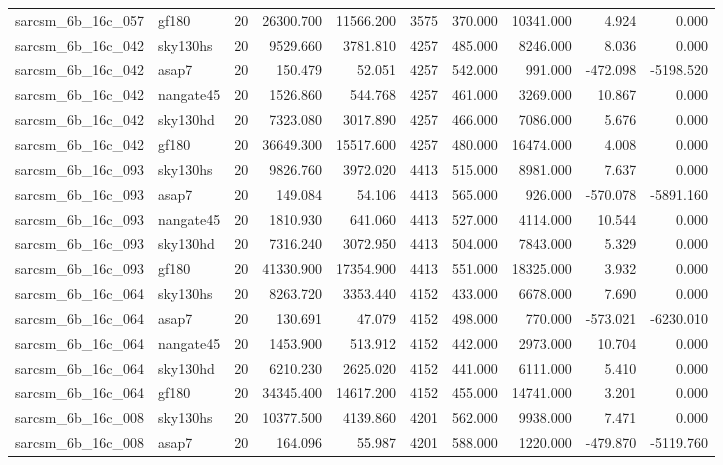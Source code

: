 \documentclass{article}
\begin{document}
\begin{longtable}{llrrrrrrrr}
sarcsm\_6b\_16c\_057 & gf180 & 20 & 26300.700 & 11566.200 & 3575 & 370.000 & 10341.000 & 4.924 & 0.000 \\
sarcsm\_6b\_16c\_042 & sky130hs & 20 & 9529.660 & 3781.810 & 4257 & 485.000 & 8246.000 & 8.036 & 0.000 \\
sarcsm\_6b\_16c\_042 & asap7 & 20 & 150.479 & 52.051 & 4257 & 542.000 & 991.000 & -472.098 & -5198.520 \\
sarcsm\_6b\_16c\_042 & nangate45 & 20 & 1526.860 & 544.768 & 4257 & 461.000 & 3269.000 & 10.867 & 0.000 \\
sarcsm\_6b\_16c\_042 & sky130hd & 20 & 7323.080 & 3017.890 & 4257 & 466.000 & 7086.000 & 5.676 & 0.000 \\
sarcsm\_6b\_16c\_042 & gf180 & 20 & 36649.300 & 15517.600 & 4257 & 480.000 & 16474.000 & 4.008 & 0.000 \\
sarcsm\_6b\_16c\_093 & sky130hs & 20 & 9826.760 & 3972.020 & 4413 & 515.000 & 8981.000 & 7.637 & 0.000 \\
sarcsm\_6b\_16c\_093 & asap7 & 20 & 149.084 & 54.106 & 4413 & 565.000 & 926.000 & -570.078 & -5891.160 \\
sarcsm\_6b\_16c\_093 & nangate45 & 20 & 1810.930 & 641.060 & 4413 & 527.000 & 4114.000 & 10.544 & 0.000 \\
sarcsm\_6b\_16c\_093 & sky130hd & 20 & 7316.240 & 3072.950 & 4413 & 504.000 & 7843.000 & 5.329 & 0.000 \\
sarcsm\_6b\_16c\_093 & gf180 & 20 & 41330.900 & 17354.900 & 4413 & 551.000 & 18325.000 & 3.932 & 0.000 \\
sarcsm\_6b\_16c\_064 & sky130hs & 20 & 8263.720 & 3353.440 & 4152 & 433.000 & 6678.000 & 7.690 & 0.000 \\
sarcsm\_6b\_16c\_064 & asap7 & 20 & 130.691 & 47.079 & 4152 & 498.000 & 770.000 & -573.021 & -6230.010 \\
sarcsm\_6b\_16c\_064 & nangate45 & 20 & 1453.900 & 513.912 & 4152 & 442.000 & 2973.000 & 10.704 & 0.000 \\
sarcsm\_6b\_16c\_064 & sky130hd & 20 & 6210.230 & 2625.020 & 4152 & 441.000 & 6111.000 & 5.410 & 0.000 \\
sarcsm\_6b\_16c\_064 & gf180 & 20 & 34345.400 & 14617.200 & 4152 & 455.000 & 14741.000 & 3.201 & 0.000 \\
sarcsm\_6b\_16c\_008 & sky130hs & 20 & 10377.500 & 4139.860 & 4201 & 562.000 & 9938.000 & 7.471 & 0.000 \\
sarcsm\_6b\_16c\_008 & asap7 & 20 & 164.096 & 55.987 & 4201 & 588.000 & 1220.000 & -479.870 & -5119.760 \\

\end{longtable}
\end{document}

